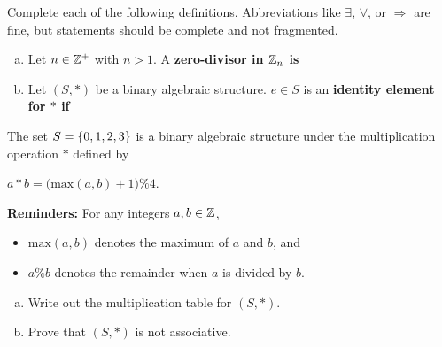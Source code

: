 \documentclass[11pt]{exam}
\begin{document}
\addpoints

\noindent
\begin{center}
\gradetable[v][pages]  %
\end{center}


\newpage %

%
%
%

\begin{questions}
\question[5] Complete each of the following definitions.  Abbreviations like $\exists$, $\forall$, or $\Rightarrow$ are fine, but statements should be complete and not fragmented.
\begin{enumerate}[(a)]
\item Let $n\in\mathbb{Z}^{+}$ with $n > 1$.  A \bf zero-divisor \md in $\mathbb{Z}_{n}$ is
\vspace{3cm}

\item Let $(S,*)$ be a binary algebraic structure.  $e\in S$ is an \bf identity element \md for $*$ if
\vspace{3cm}
\end{enumerate}
\newpage


\question[5] The set $S = \left\{0,1,2,3\right\}$ is a binary algebraic structure under the multiplication operation $*$ defined by
\begin{center}
$a*b = \big(\text{max}(a,b) + 1\big)\% 4$.
\end{center}
\textbf{Reminders:} For any integers $a,b\in\mathbb{Z}$,
\begin{itemize}
	\item $\text{max}(a,b)$ denotes the maximum of $a$ and $b$, and
	\item $a\% b$ denotes the remainder when $a$ is divided by $b$.
\end{itemize}
\begin{enumerate}[(a)]
\item Write out the multiplication table for $(S,*)$.
\vspace{8cm}

\item Prove that $(S,*)$ is not associative.
\vspace{5cm}
\end{enumerate}
\end{questions}
\end{document}
